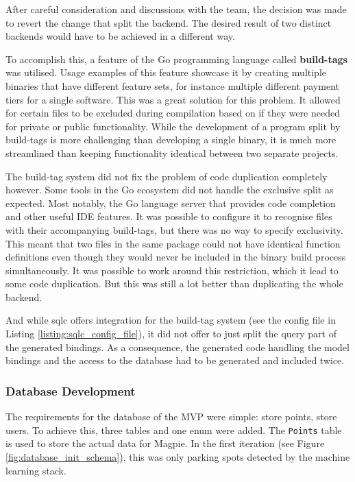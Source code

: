 After careful consideration and discussions with the team, the decision was made
to revert the change that split the backend. The desired result of two distinct
backends would have to be achieved in a different way.

To accomplish this, a feature of the Go programming language called
\textbf{build-tags} was utilised. Usage examples of this feature showcase it by
creating multiple binaries that have different feature sets, for instance
multiple different payment tiers for a single software. This was a great
solution for this problem. It allowed for certain files to be excluded during
compilation based on if they were needed for private or public functionality.
While the development of a program split by build-tags is more challenging
than developing a single binary, it is much more streamlined than keeping
functionality identical between two separate projects.

The build-tag system did not fix the problem of code duplication completely
however. Some tools in the Go ecosystem did not handle the exclusive split as
expected. Most notably, the Go language server that provides code completion and
other useful IDE features. It was possible to configure it to recognise files
with their accompanying build-tags, but there was no way to specify exclusivity.
This meant that two files in the same package could not have identical function
definitions even though they would never be included in the binary build process
simultaneously. It was possible to work around this restriction, which it lead
to some code duplication. But this was still a lot better than duplicating the
whole backend.

And while sqlc offers integration for the build-tag system (see the config file
in Listing \ref{listing:sqlc_config_file}), it did not offer to just split the
query part of the generated bindings. As a consequence, the generated code
handling the model bindings and the access to the database had to be generated
and included twice.

\subsubsection{Database Development}\label{database_development}
The requirements for the database of the MVP were simple: store points, store
users. To achieve this, three tables and one enum were added. The
\texttt{Points} table is used to store the actual data for Magpie. In the first
iteration (see Figure \ref{fig:database_init_schema}), this was only parking
spots detected by the machine learning stack.

